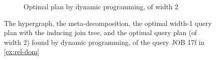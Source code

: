 \begin{figure}
\begin{subfigure}{.3\linewidth}
        \caption{Optimal plan by dynamic programming, of width 2}
        \label{fig:rel-dom-duckdb}
    \end{subfigure}
    \caption{The hypergraph, the meta-decomposition, the optimal width-1 query plan with the inducing join tree, and the optimal query plan (of width 2) found by dynamic programming, of the query JOB 17f in \cref{ex:rel-dom}}
    \label{fig:rel-dom}
\end{figure}
